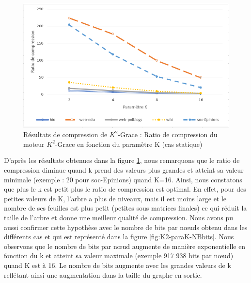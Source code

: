 \begin{figure}[H]
	\centering
	\includegraphics[scale=0.8]{ressources/image/Tests/K2-paraK-Ratio.png}
	
	\caption{Résultats de compression de $K^2$-Grace : Ratio de compression du moteur $K^2$-Grace en fonction du paramètre K (cas statique)}
	\label{fig:K2-paraK-Ratio}
\end{figure}

D'après les résultats obtenues dans la figure \ref{fig:K2-paraK-Ratio}, nous remarquons que le ratio de compression diminue quand k prend des valeurs plus grandes et atteint sa valeur minimale (exemple : 20 pour soc-Epinions) quand K=16. Ainsi, nous constatons que plus le k est petit plus le ratio de compression est optimal. En effet, pour des petites valeurs de K, l'arbre a plus de niveaux, mais il est moins large et le nombre de ses feuilles est plus petit (petites sous matrices finales) ce qui réduit la taille de l'arbre et donne une meilleur qualité de compression. Nous avons pu aussi confirmer cette hypothèse avec le nombre de bits par nœuds obtenu dans les différents cas et qui est représenté dans la figure \ref{fig:K2-paraK-NBbits}. Nous observons que le nombre de bits par nœud augmente de manière exponentielle en fonction du k et atteint sa valeur maximale (exemple 917 938 bits par nœud) quand K est à 16. Le nombre de bits augmente avec les grandes valeurs de k reflétant ainsi une augmentation dans la taille du graphe en sortie.

